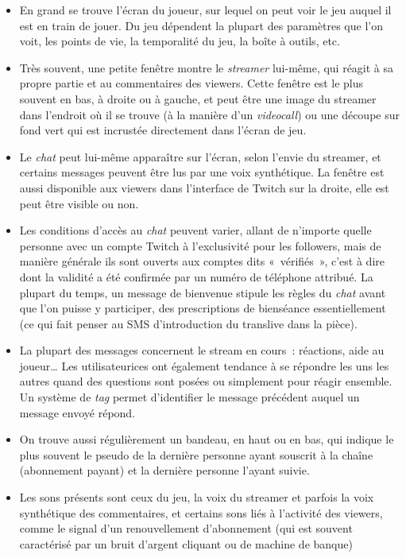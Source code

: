 \documentclass[
]{article}
\providecommand{\tightlist}{%
  \setlength{\itemsep}{0pt}\setlength{\parskip}{0pt}}
\begin{document}
\begin{itemize}
\tightlist
\item
  En grand se trouve l'écran du joueur, sur lequel on peut voir le jeu auquel il est en train de jouer. Du jeu dépendent la plupart des paramètres que l'on voit, les points de vie, la temporalité du jeu, la boîte à outils, etc.
\item
  Très souvent, une petite fenêtre montre le \emph{streamer} lui-même, qui réagit à sa propre partie et au commentaires des viewers. Cette fenêtre est le plus souvent en bas, à droite ou à gauche, et peut être une image du streamer dans l'endroit où il se trouve (à la manière d'un \emph{videocall}) ou une découpe sur fond vert qui est incrustée directement dans l'écran de jeu.
\item
  Le \emph{chat} peut lui-même apparaître sur l'écran, selon l'envie du streamer, et certains messages peuvent être lus par une voix synthétique. La fenêtre est aussi disponible aux viewers dans l'interface de Twitch sur la droite, elle est peut être visible ou non.
\item
  Les conditions d'accès au \emph{chat} peuvent varier, allant de n'importe quelle personne avec un compte Twitch à l'exclusivité pour les followers, mais de manière générale ils sont ouverts aux comptes dits «~vérifiés~», c'est à dire dont la validité a été confirmée par un numéro de téléphone attribué. La plupart du temps, un message de bienvenue stipule les règles du \emph{chat} avant que l'on puisse y participer, des prescriptions de bienséance essentiellement (ce qui fait penser au SMS d'introduction du translive dans la pièce).
\item
  La plupart des messages concernent le stream en cours~: réactions, aide au joueur\ldots{} Les utilisateurices ont également tendance à se répondre les uns les autres quand des questions sont posées ou simplement pour réagir ensemble. Un système de \emph{tag} permet d'identifier le message précédent auquel un message envoyé répond.
\item
  On trouve aussi régulièrement un bandeau, en haut ou en bas, qui indique le plus souvent le pseudo de la dernière personne ayant souscrit à la chaîne (abonnement payant) et la dernière personne l'ayant suivie.
\item
  Les sons présents sont ceux du jeu, la voix du streamer et parfois la voix synthétique des commentaires, et certains sons liés à l'activité des viewers, comme le signal d'un renouvellement d'abonnement (qui est souvent caractérisé par un bruit d'argent cliquant ou de machine de banque)
\end{itemize}
\end{document}
